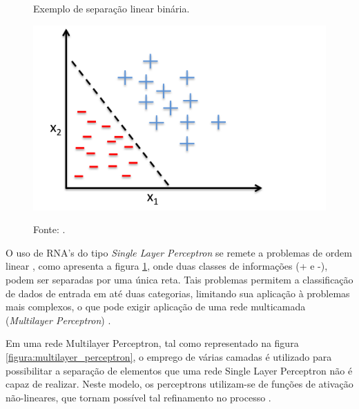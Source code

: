 \newpage

\begin{figure}[h]
	\caption{Exemplo de separação linear binária.}
	\caption*{Fonte: .}
	\centering %
	\includegraphics[width=14cm]{resources/perceptron_binary.png} %
	\label{figura:perceptron_binary}	
\end{figure}

O uso de RNA's do tipo \textit{Single Layer Perceptron} se remete a problemas de ordem linear \cite{haykin2009neural}, como apresenta a figura \ref{figura:perceptron_binary}, onde duas classes de informações (+ e -), podem ser separadas por uma única reta. Tais problemas permitem a classificação de dados de entrada em até duas categorias, limitando sua aplicação à problemas mais complexos, o que pode exigir aplicação de uma rede multicamada (\textit{Multilayer Perceptron}) \cite{fausett1994fundamentals}.

Em uma rede Multilayer Perceptron, tal como representado na figura \ref{figura:multilayer_perceptron}, o emprego de várias camadas é utilizado para possibilitar a separação de elementos que uma rede Single Layer Perceptron não é capaz de realizar. Neste modelo, os perceptrons utilizam-se de funções de ativação não-lineares, que tornam possível tal refinamento no processo \cite{marius2009}.

